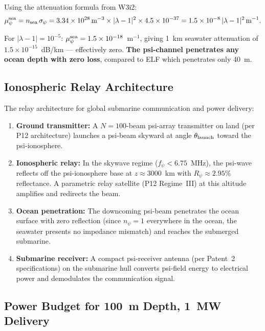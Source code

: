 \documentclass[aps,prd,twocolumn,superscriptaddress]{revtex4-2}
\newcommand{\npsi}{n_\psi}
\begin{document}
Using the attenuation formula from W3i2:
\begin{equation}
\mu_\psi^{\rm sea} = n_{\rm sea}\,\sigma_\psi
= 3.34\times10^{28}\,\text{m}^{-3} \times |\lambda-1|^2 \times 4.5\times10^{-37}
= 1.5\times10^{-8}\,|\lambda-1|^2\,\text{m}^{-1}.
\end{equation}

For $|\lambda-1| = 10^{-5}$:
$\mu_\psi^{\rm sea} = 1.5\times10^{-18}$~m$^{-1}$,
giving 1~km seawater attenuation of $1.5\times10^{-15}$~dB/km ---
effectively zero.  \textbf{The psi-channel penetrates any ocean depth
with zero loss}, compared to ELF which penetrates only 40~m.

\subsection{Ionospheric Relay Architecture}

The relay architecture for global submarine communication and power
delivery:

\begin{enumerate}
  \item \textbf{Ground transmitter:} A $N = 100$-beam psi-array transmitter
    on land (per P12 architecture) launches a psi-beam skyward at angle
    $\theta_{\rm launch}$ toward the psi-ionosphere.
  \item \textbf{Ionospheric relay:} In the skywave regime ($f_\psi < 6.75$~MHz),
    the psi-wave reflects off the psi-ionosphere base at $z \approx 3000$~km
    with $R_\psi \approx 2.95\%$ reflectance.  A parametric relay satellite
    (P12 Regime~III) at this altitude amplifies and redirects the beam.
  \item \textbf{Ocean penetration:} The downcoming psi-beam penetrates the
    ocean surface with zero reflection (since $\npsi = 1$ everywhere in
    the ocean, the seawater presents no impedance mismatch) and reaches
    the submerged submarine.
  \item \textbf{Submarine receiver:} A compact psi-receiver antenna
    (per Patent~2 specifications) on the submarine hull converts
    psi-field energy to electrical power and demodulates the
    communication signal.
\end{enumerate}

\subsection{Power Budget for 100~m Depth, 1~MW Delivery}
\end{document}
